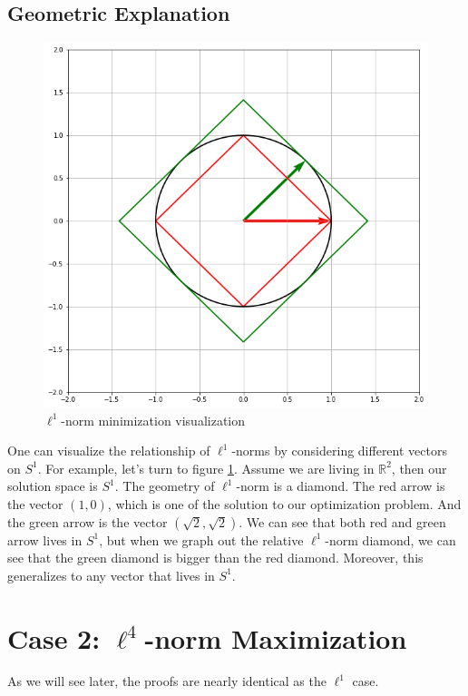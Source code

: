 \documentclass[11pt]{article}
\begin{document}
\subsection{Geometric Explanation}
    \begin{figure}[h]
        \centering
        \includegraphics[scale=0.4]{l1norm_bound.png}
        \caption{$\ell^{1}$-norm minimization visualization}
        \label{fig:l1_bound}
    \end{figure}
    One can visualize the relationship of $\ell^1$-norms by considering different vectors on $S^1$. For example, let's turn to figure \ref{fig:l1_bound}. Assume we are living in $\mathbb{R}^2$, then our solution space is $S^{1}$. The geometry of $\ell^1$-norm is a diamond. The red arrow is the vector $(1, 0)$, which is one of the solution to our optimization problem. And the green arrow is the vector $(\sqrt{2}, \sqrt{2})$. We can see that both red and green arrow lives in $S^1$, but when we graph out the relative $\ell^1$-norm diamond, we can see that the green diamond is bigger than the red diamond. Moreover, this generalizes to any vector that lives in $S^1$. 


\section{Case 2: $\ell^4$-norm Maximization}
	As we will see later, the proofs are nearly identical as the $\ell^{1}$ case.
\end{document}
